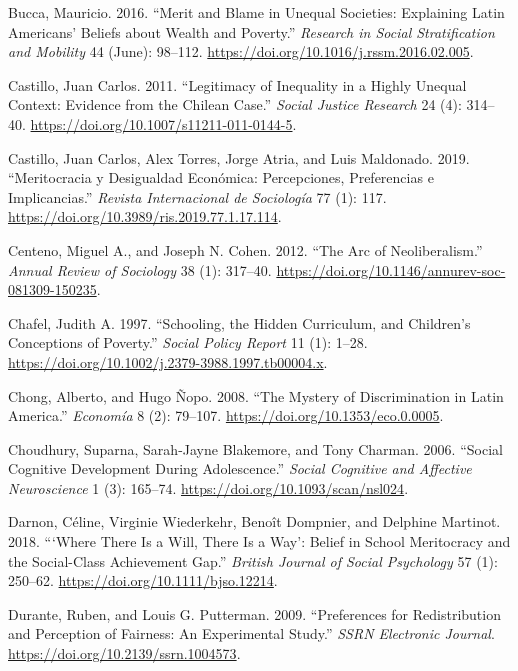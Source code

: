 \documentclass[
  letterpaper,
  DIV=11,
  numbers=noendperiod]{scrartcl}
\newlength{\cslhangindent}
\newenvironment{CSLReferences}[2] %
 {\begin{list}{}{%
  \setlength{\itemindent}{0pt}
  \setlength{\leftmargin}{0pt}
  \setlength{\parsep}{0pt}
  \ifodd #1
   \setlength{\leftmargin}{\cslhangindent}
   \setlength{\itemindent}{-1\cslhangindent}
  \fi
  \setlength{\itemsep}{#2\baselineskip}}}
 {\end{list}}
\begin{document}
\begin{CSLReferences}{1}{0}
Bucca, Mauricio. 2016. {``Merit and Blame in Unequal Societies:
{Explaining Latin Americans}' Beliefs about Wealth and Poverty.''}
\emph{Research in Social Stratification and Mobility} 44 (June):
98--112. \url{https://doi.org/10.1016/j.rssm.2016.02.005}.

Castillo, Juan Carlos. 2011. {``Legitimacy of {Inequality} in a {Highly
Unequal Context}: {Evidence} from the {Chilean Case}.''} \emph{Social
Justice Research} 24 (4): 314--40.
\url{https://doi.org/10.1007/s11211-011-0144-5}.

Castillo, Juan Carlos, Alex Torres, Jorge Atria, and Luis Maldonado.
2019. {``Meritocracia y Desigualdad Econ{ó}mica: {Percepciones},
Preferencias e Implicancias.''} \emph{Revista Internacional de
Sociolog{í}a} 77 (1): 117.
\url{https://doi.org/10.3989/ris.2019.77.1.17.114}.

Centeno, Miguel A., and Joseph N. Cohen. 2012. {``The {Arc} of
{Neoliberalism}.''} \emph{Annual Review of Sociology} 38 (1): 317--40.
\url{https://doi.org/10.1146/annurev-soc-081309-150235}.

Chafel, Judith A. 1997. {``Schooling, the {Hidden Curriculum}, and
{Children}'s {Conceptions} of {Poverty}.''} \emph{Social Policy Report}
11 (1): 1--28. \url{https://doi.org/10.1002/j.2379-3988.1997.tb00004.x}.

Chong, Alberto, and Hugo Ñopo. 2008. {``The {Mystery} of
{Discrimination} in {Latin America}.''} \emph{Econom{í}a} 8 (2):
79--107. \url{https://doi.org/10.1353/eco.0.0005}.

Choudhury, Suparna, Sarah-Jayne Blakemore, and Tony Charman. 2006.
{``Social Cognitive Development During Adolescence.''} \emph{Social
Cognitive and Affective Neuroscience} 1 (3): 165--74.
\url{https://doi.org/10.1093/scan/nsl024}.

Darnon, Céline, Virginie Wiederkehr, Benoît Dompnier, and Delphine
Martinot. 2018. {``{`{Where} There Is a Will, There Is a Way'}: {Belief}
in School Meritocracy and the Social-Class Achievement Gap.''}
\emph{British Journal of Social Psychology} 57 (1): 250--62.
\url{https://doi.org/10.1111/bjso.12214}.

Durante, Ruben, and Louis G. Putterman. 2009. {``Preferences for
{Redistribution} and {Perception} of {Fairness}: {An Experimental
Study}.''} \emph{SSRN Electronic Journal}.
\url{https://doi.org/10.2139/ssrn.1004573}.


\end{CSLReferences}
\end{document}
